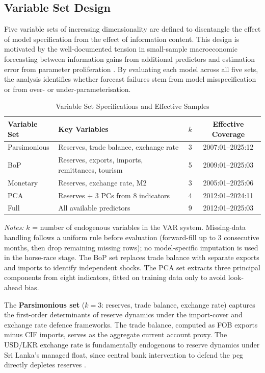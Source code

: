 \documentclass[12pt,a4paper]{article}
\begin{document}
\subsection{Variable Set Design}

Five variable sets of increasing dimensionality are defined to disentangle the effect of model specification from the effect of information content. This design is motivated by the well-documented tension in small-sample macroeconomic forecasting between information gains from additional predictors and estimation error from parameter proliferation \citep{Banbura2010,Carriero2015}. By evaluating each model across all five sets, the analysis identifies whether forecast failures stem from model misspecification or from over- or under-parameterisation.

\begin{table}[htbp]
\centering
\caption{Variable Set Specifications and Effective Samples}
\label{tab:varsets}
\begin{tabular}{llcc}
\toprule
Variable Set & Key Variables & $k$ & Effective Coverage \\
\midrule
Parsimonious & Reserves, trade balance, exchange rate & 3 & 2007:01--2025:12 \\
BoP & Reserves, exports, imports, remittances, tourism & 5 & 2009:01--2025:03 \\
Monetary & Reserves, exchange rate, M2 & 3 & 2005:01--2025:06 \\
PCA & Reserves + 3 PCs from 8 indicators & 4 & 2012:01--2024:11 \\
Full & All available predictors & 9 & 2012:01--2025:03 \\
\bottomrule
\end{tabular}
\begin{tablenotes}
\small
\item \textit{Notes:} $k$ = number of endogenous variables in the VAR system. Missing-data handling follows a uniform rule before evaluation (forward-fill up to 3 consecutive months, then drop remaining missing rows); no model-specific imputation is used in the horse-race stage. The BoP set replaces trade balance with separate exports and imports to identify independent shocks. The PCA set extracts three principal components from eight indicators, fitted on training data only to avoid look-ahead bias.
\end{tablenotes}
\end{table}

The \textbf{Parsimonious set} ($k=3$: reserves, trade balance, exchange rate) captures the first-order determinants of reserve dynamics under the import-cover and exchange rate defence frameworks. The trade balance, computed as FOB exports minus CIF imports, serves as the aggregate current account proxy. The USD/LKR exchange rate is fundamentally endogenous to reserve dynamics under Sri Lanka's managed float, since central bank intervention to defend the peg directly depletes reserves \citep{Obstfeld2010}.
\end{document}
